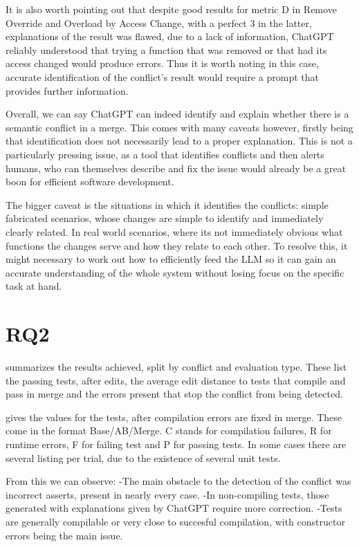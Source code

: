 It is also worth pointing out that despite good results for metric D in Remove Override and Overload by Access Change, with a perfect 3 in the latter, explanations of the result was flawed, due to a lack of information, ChatGPT reliably understood that trying a function that was removed or that had its access changed would produce errors. Thus it is worth noting in this case, accurate identification of the conflict's result would require a prompt that provides further information.

Overall, we can say ChatGPT can indeed identify and explain whether there is a semantic conflict in a merge. This comes with many caveats however, firstly being that identification does not necessarily lead to a proper explanation. This is not a particularly pressing issue, as a tool that identifies conflicts and then alerts humans, who can themselves describe and fix the issue would already be a great boon for efficient software development.

The bigger caveat is the situations in which it identifies the conflicts: simple fabricated scenarios, whose changes are simple to identify and immediately clearly related. In real world scenarios, where its not immediately obvious what functions the changes serve and how they relate to each other. To resolve this, it might necessary to work out how to efficiently feed the LLM so it can gain an accurate understanding of the whole system without losing focus on the specific task at hand.

\section{RQ2}\label{sec:results:rq2}

 summarizes the results achieved, split by conflict and evaluation type.
These list the passing tests, after edits, the average edit distance to tests that compile and pass in merge 
and the errors present that stop the conflict from being detected.

 gives the values for the tests, after compilation errors are fixed in merge.
These come in the format Base/AB/Merge. C stands for compilation failures, R for runtime errors, F for failing test and P for passing tests.
In some cases there are several listing per trial, due to the existence of several unit tests.

From this we can observe:
-The main obstacle to the detection of the conflict was incorrect asserts, present in nearly every case.
-In non-compiling tests, those generated with explanations given by ChatGPT require more correction.
-Tests are generally compilable or very close to succesful compilation, with constructor errors being the main issue.

